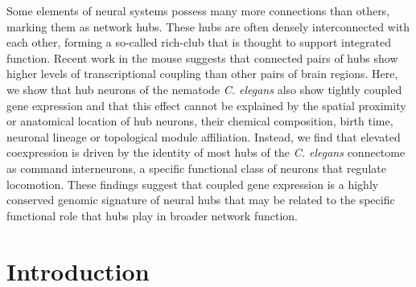 Some elements of neural systems possess many more connections than others, marking them as network hubs.
These hubs are often densely interconnected with each other, forming a so-called rich-club that is thought to support integrated function.
Recent work in the mouse suggests that connected pairs of hubs show higher levels of transcriptional coupling than other pairs of brain regions.
Here, we show that hub neurons of the nematode \textit{C. elegans} also show tightly coupled gene expression and that this effect cannot be explained by the spatial proximity or anatomical location of hub neurons, their chemical composition, birth time, neuronal lineage or topological module affiliation.
Instead, we find that elevated coexpression is driven by the identity of most hubs of the \textit{C. elegans} connectome as command interneurons, a specific functional class of neurons that regulate locomotion.
These findings suggest that coupled gene expression is a highly conserved genomic signature of neural hubs that may be related to the specific functional role that hubs play in broader network function.

\section{Introduction}
\label{sec:introduction_ch2}

